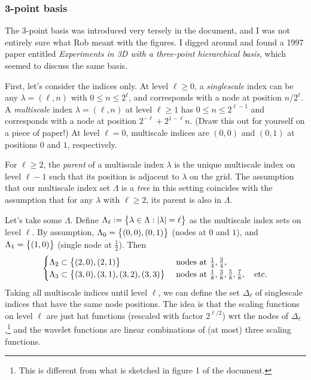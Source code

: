 \documentclass[11pt,a4paper]{amsart}
\theoremstyle{definition}
\begin{document}
\subsubsection*{3-point basis}
The 3-point basis was introduced very tersely in the document, and I was not entirely
sure what Rob meant with the figures. I digged around and found a 1997 paper entitled
\emph{Experiments in 3D with a three-point hierarchical basis}, which seemed to
discuss the same basis.

First, let's consider the indices only. At level $\ell \geq 0$, a \emph{singlescale}
index can be any $\lambda = (\ell, n)$ with $0 \leq n \leq 2^\ell$, and
corresponds with a node at position $n/2^\ell$. A \emph{multiscale} index
$\lambda = (\ell, n)$ at level $\ell \geq 1$ has $0 \leq n \leq 2^{\ell-1}$ and
corresponds with a node at position $2^{-\ell} + 2^{1-\ell} n$. (Draw this out
for yourself on a piece of paper!) At level $\ell=0$, multiscale indices are
$(0,0)$ and $(0,1)$ at positions $0$ and $1$, respectively.

For $\ell \geq 2$, the \emph{parent} of a multiscale index $\lambda$ is the
unique multiscale index on level $\ell-1$ such that its position is adjacent to
$\lambda$ on the grid. The assumption that our multiscale index set $\Lambda$ is
a \emph{tree} in this setting coincides with the assumption that for any $\lambda$
with $\ell\geq 2$, its parent is also in $\Lambda$.

Let's take some $\Lambda$. Define $\Lambda_\ell := \set{\lambda \in \Lambda: |\lambda| = \ell}$ as the multiscale index sets on level $\ell$. By assumption,
$\Lambda_0 = \set{(0,0), (0,1)}$ (nodes at $0$ and $1$), and
$\Lambda_1 = \set{(1,0)}$ (single node at $\frac{1}{2}$). Then 
\[
  \begin{cases}
    \Lambda_2 \subset \set{(2,0), (2,1)} &\text{ nodes at } \tfrac{1}{4}, \tfrac{3}{4}, \\
    \Lambda_3 \subset \set{(3,0), (3,1), (3,2), (3,3)} &\text{ nodes at } \tfrac{1}{8}, \tfrac{3}{8}, \tfrac{5}{8}, \tfrac{7}{8}, \quad \text{etc.}
  \end{cases}
\]
Taking all multiscale indices until level $\ell$, we can define the set
$\Delta_\ell$ of singlescale indices that have the same node positions.
The idea is that the scaling functions on level $\ell$ are just hat functions
(rescaled with factor $2^{\ell/2}$) wrt the nodes of $\Delta_\ell$,\footnote{This
is different from what is sketched in figure 1 of the document.} and the
wavelet functions are linear combinations of (at most) three scaling functions.
\end{document}
